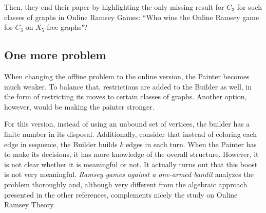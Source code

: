 Then, they end their paper by highlighting the only missing result for $C_3$ for such classes of graphs in Online Ramsey Games: ``Who wins the Online Ramsey game for $C_3$ on $X_5$-free graphs"?

\subsection*{One more problem}

When changing the offline problem to the online version, the Painter becomes much weaker. To balance that, restrictions are added to the Builder as well, in the form of restricting its moves to certain classes of graphs. Another option, however, would be making the painter stronger.

For this version, instead of using an unbound set of vertices, the builder has a finite number in its disposal. Additionally, consider that instead of coloring each edge in sequence, the Builder builds $k$ edges in each turn. When the Painter has to make its decisions, it has more knowledge of the overall structure. However, it is not clear whether it is meaningful or not. It actually turns out that this boost is not very meaningful\cite{7}. \textit{Ramsey games against a one-armed bandit} analyzes the problem thoroughly and, although very different from the algebraic approach presented in the other references, complements nicely the study on Online Ramsey Theory. 




